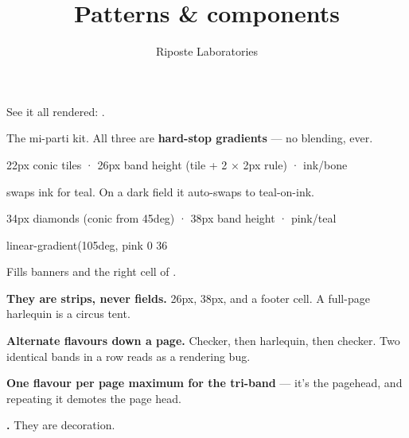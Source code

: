 \documentclass[fontpath=fonts/,logopath=logo/]{riposte-doc}
\title{Patterns \& components}
\author{Riposte Laboratories}
\date{}
\begin{document}
\ripmakehead

\riptoc

See it all rendered: .



The mi-parti kit. All three are \textbf{hard-stop gradients} — no blending, ever.



\ripcodeopen
{}
\begin{ripcodeblock}
22px conic tiles · 26px band height (tile + 2 × 2px rule) · ink/bone
\end{ripcodeblock}
\ripcodesizereset\ripcodeclose

 swaps ink for teal. On a dark field it auto-swaps to teal-on-ink.



\ripcodeopen
{}
\begin{ripcodeblock}
34px diamonds (conic from 45deg) · 38px band height · pink/teal
\end{ripcodeblock}
\ripcodesizereset\ripcodeclose



\ripcodeopen
{}
\begin{ripcodeblock}
linear-gradient(105deg, pink 0 36%
\end{ripcodeblock}
\ripcodesizereset\ripcodeclose

Fills  banners and the right cell of .



\begin{ripnumbers}
\item \textbf{They are strips, never fields.} 26px, 38px, and a footer cell. A full-page harlequin is a circus tent.
\item \textbf{Alternate flavours down a page.} Checker, then harlequin, then checker. Two identical bands in a row reads as a rendering bug.
\item \textbf{One flavour per page maximum for the tri-band} — it's the pagehead, and repeating it demotes the page head.
\item \textbf{.} They are decoration.
\end{ripnumbers}
\end{document}
